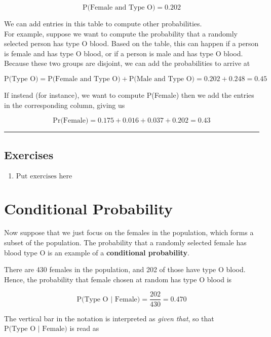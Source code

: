 \documentclass[
]{book}
\providecommand{\tightlist}{%
  \setlength{\itemsep}{0pt}\setlength{\parskip}{0pt}}
\begin{document}
\[
\mbox{P(Female and Type O)} = 0.202
\]

We can add entries in this table to compute other probabilities.\\
For example, suppose we want to compute the probability that a randomly selected person has type O blood.
Based on the table, this can happen if a person is female and has type O blood, or if a person is male and has type O blood.
Because these two groups are disjoint, we can add the probabilities to arrive at

\[
\mbox{P(Type O)} = \mbox{P(Female and Type O)} + \mbox{P(Male and Type O)}
= 0.202 + 0.248 = 0.45
\]

If instead (for instance), we want to compute P(Female) then we add the entries in the corresponding column, giving us

\[
\mbox{Pr(Female)} = 0.175 + 0.016 + 0.037 + 0.202 = 0.43 
\]

\begin{center}\rule{0.5\linewidth}{0.5pt}\end{center}

\hypertarget{exercises-1}{%
\section{Exercises}\label{exercises-1}}

\begin{enumerate}
\def\labelenumi{\arabic{enumi}.}
\tightlist
\item
  \(\text{Put exercises here}\)
\end{enumerate}

\hypertarget{conditional-probability}{%
\chapter{Conditional Probability}\label{conditional-probability}}

Now suppose that we just focus on the females in the population, which forms a subset of the population.
The probability that a randomly selected female has blood type O is an example of a \textbf{conditional probability}.

There are 430 females in the population, and 202 of those have type O blood.
Hence, the probability that female chosen at random has type O blood is

\[
\mbox{P(Type O | Female)} = \frac{202}{430} = 0.470
\]

The vertical bar in the notation is interpreted as \emph{given that}, so that \(\mbox{P(Type O | Female)}\) is read as
\end{document}
